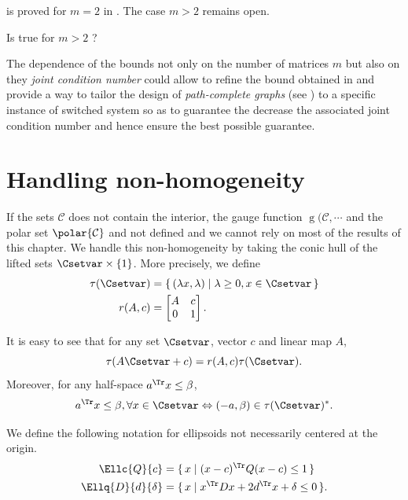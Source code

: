 \documentclass[11pt,twoside,a4paper,openright]{uclouvain-thesis}
\newcommand{\Cset}{\mathcal{C}}
\DeclareMathOperator{\gauge}{g}
\begin{document}
 is proved for $m = 2$ in .
The case $m > 2$ remains open.

\begin{myopen}
  Is  true for $m > 2$ ?
\end{myopen}

The dependence of the bounds not only on the number of matrices $m$ but also on they \emph{joint condition number}
could allow to refine the bound obtained in  and provide a way
to tailor the design of \emph{path-complete graphs} (see \cite{ahmadi2014joint})
to a specific instance of switched system so as to guarantee the decrease the
associated joint condition number and hence ensure the best possible guarantee.

\section{Handling non-homogeneity}
\label{sec:homogenization}
If the sets $\Cset$ does not contain the interior,
the gauge function $\gauge(\Cset, \cdots$ and the polar set $\polar{\Cset}$
and not defined
and we cannot rely on most of the results of this chapter.
We handle this non-homogeneity by taking the conic hull of the lifted sets $\Csetvar \times \{1\}$.
More precisely, we define
\begin{align}
  \label{eq:tau}
  \tau(\Csetvar) & = \{\, (\lambda x, \lambda) \mid \lambda \geq 0, x \in \Csetvar \,\}\\
  \notag
  r(A, c) & =
  \begin{bmatrix}
    A & c\\
    0 & 1
  \end{bmatrix}.
\end{align}

It is easy to see that for any set $\Csetvar$, vector $c$ and linear map $A$,
\begin{equation}
  \label{eq:taur}
  \tau(A\Csetvar + c) = r(A, c) \tau(\Csetvar).
\end{equation}
Moreover, for any half-space $a^\Tr x \leq \beta$,
\begin{equation}
  \label{eq:hs}
  a^\Tr x \leq \beta, \forall x \in \Csetvar \Leftrightarrow (-a, \beta) \in \tau(\Csetvar)^*.
\end{equation}

We define the following notation for ellipsoids not necessarily centered at the origin.
\begin{align*}
  \Ellc{Q}{c} & = \{\, x \mid (x-c)^\Tr Q (x-c) \leq 1 \,\}\\
  \Ellq{D}{d}{\delta} & = \{\, x \mid x^\Tr D x + 2d^\Tr x + \delta \leq 0 \,\}.
\end{align*}
\end{document}
